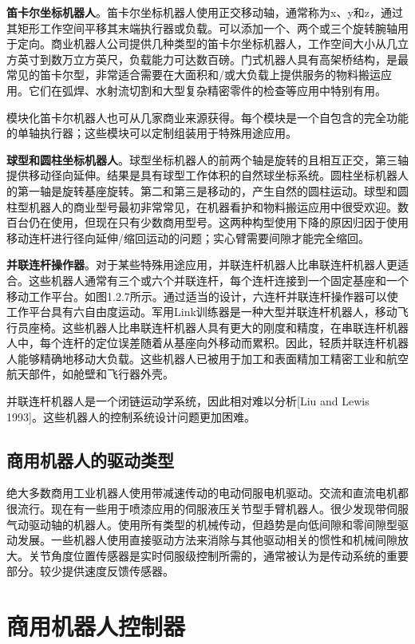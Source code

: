 \documentclass[UTF8,a4paper]{ctexart}
\begin{document}
\textbf{笛卡尔坐标机器人}。笛卡尔坐标机器人使用正交移动轴，通常称为x、y和z，通过其矩形工作空间平移其末端执行器或负载。可以添加一个、两个或三个旋转腕轴用于定向。商业机器人公司提供几种类型的笛卡尔坐标机器人，工作空间大小从几立方英寸到数万立方英尺，负载能力可达数百磅。门式机器人具有高架桥结构，是最常见的笛卡尔型，非常适合需要在大面积和/或大负载上提供服务的物料搬运应用。它们在弧焊、水射流切割和大型复杂精密零件的检查等应用中特别有用。

模块化笛卡尔机器人也可从几家商业来源获得。每个模块是一个自包含的完全功能的单轴执行器；这些模块可以定制组装用于特殊用途应用。

\textbf{球型和圆柱坐标机器人}。球型坐标机器人的前两个轴是旋转的且相互正交，第三轴提供移动径向延伸。结果是具有球型工作体积的自然球坐标系统。圆柱坐标机器人的第一轴是旋转基座旋转。第二和第三是移动的，产生自然的圆柱运动。球型和圆柱型机器人的商业型号最初非常常见，在机器看护和物料搬运应用中很受欢迎。数百台仍在使用，但现在只有少数商用型号。这两种构型使用下降的原因归因于使用移动连杆进行径向延伸/缩回运动的问题；实心臂需要间隙才能完全缩回。

\textbf{并联连杆操作器}。对于某些特殊用途应用，并联连杆机器人比串联连杆机器人更适合。这些机器人通常有三个或六个并联连杆，每个连杆连接到一个固定基座和一个移动工作平台。如图1.2.7所示。通过适当的设计，六连杆并联连杆操作器可以使工作平台具有六自由度运动。军用Link训练器是一种大型并联连杆机器人，移动飞行员座椅。这些机器人比串联连杆机器人具有更大的刚度和精度，在串联连杆机器人中，每个连杆的定位误差随着从基座向外移动而累积。因此，轻质并联连杆机器人能够精确地移动大负载。这些机器人已被用于加工和表面精加工精密工业和航空航天部件，如舱壁和飞行器外壳。

并联连杆机器人是一个闭链运动学系统，因此相对难以分析[Liu and Lewis 1993]。这些机器人的控制系统设计问题更加困难。

\subsection{商用机器人的驱动类型}

绝大多数商用工业机器人使用带减速传动的电动伺服电机驱动。交流和直流电机都很流行。现在有一些用于喷漆应用的伺服液压关节型手臂机器人。很少发现带伺服气动驱动轴的机器人。使用所有类型的机械传动，但趋势是向低间隙和零间隙型驱动发展。一些机器人使用直接驱动方法来消除与其他驱动相关的惯性和机械间隙放大。关节角度位置传感器是实时伺服级控制所需的，通常被认为是传动系统的重要部分。较少提供速度反馈传感器。

\section{商用机器人控制器}
\end{document}
